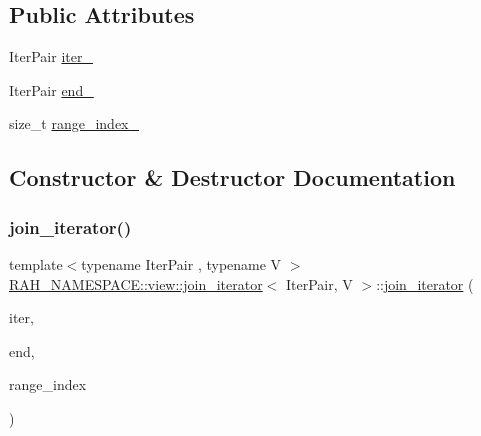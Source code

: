 \subsection*{Public Attributes}
\begin{DoxyCompactItemize}
\item 
Iter\+Pair \mbox{\hyperlink{struct_r_a_h___n_a_m_e_s_p_a_c_e_1_1view_1_1join__iterator_ae222062be5abe02dc362a6050cd09ee2}{iter\+\_\+}}
\item 
Iter\+Pair \mbox{\hyperlink{struct_r_a_h___n_a_m_e_s_p_a_c_e_1_1view_1_1join__iterator_adc53be5590b6f4a9e8d7634fdc48d188}{end\+\_\+}}
\item 
size\+\_\+t \mbox{\hyperlink{struct_r_a_h___n_a_m_e_s_p_a_c_e_1_1view_1_1join__iterator_a115eb3aea1bead65f13e62505315ee50}{range\+\_\+index\+\_\+}}
\end{DoxyCompactItemize}


\subsection{Constructor \& Destructor Documentation}
\mbox{\label{struct_r_a_h___n_a_m_e_s_p_a_c_e_1_1view_1_1join__iterator_a9667543cbe60443640165c2b0f40e930}} 
\subsubsection{\texorpdfstring{join\_iterator()}{join\_iterator()}}
{\footnotesize\ttfamily template$<$typename Iter\+Pair , typename V $>$ \\
\mbox{\hyperlink{struct_r_a_h___n_a_m_e_s_p_a_c_e_1_1view_1_1join__iterator}{R\+A\+H\+\_\+\+N\+A\+M\+E\+S\+P\+A\+C\+E\+::view\+::join\+\_\+iterator}}$<$ Iter\+Pair, V $>$\+::\mbox{\hyperlink{struct_r_a_h___n_a_m_e_s_p_a_c_e_1_1view_1_1join__iterator}{join\+\_\+iterator}} (\begin{DoxyParamCaption}\item[{Iter\+Pair const \&}]{iter,  }\item[{Iter\+Pair const \&}]{end,  }\item[{size\+\_\+t}]{range\+\_\+index }\end{DoxyParamCaption})\hspace{0.3cm}{\ttfamily [inline]}}



